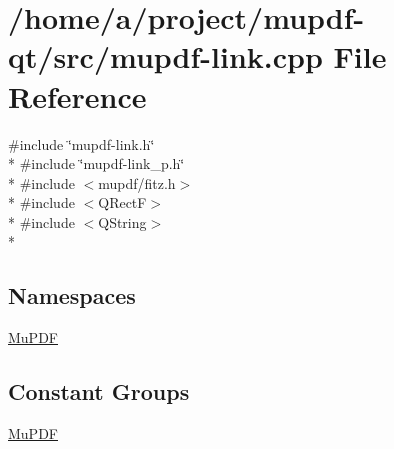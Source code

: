 \hypertarget{mupdf-link_8cpp}{\section{/home/a/project/mupdf-\/qt/src/mupdf-\/link.cpp File Reference}
\label{mupdf-link_8cpp}
}
{\ttfamily \#include \char`\"{}mupdf-\/link.\-h\char`\"{}}\\*
{\ttfamily \#include \char`\"{}mupdf-\/link\-\_\-p.\-h\char`\"{}}\\*
{\ttfamily \#include $<$mupdf/fitz.\-h$>$}\\*
{\ttfamily \#include $<$Q\-Rect\-F$>$}\\*
{\ttfamily \#include $<$Q\-String$>$}\\*
\subsection*{Namespaces}
\begin{DoxyCompactItemize}
\item 
\hyperlink{namespace_mu_p_d_f}{Mu\-P\-D\-F}
\end{DoxyCompactItemize}
\subsection*{Constant Groups}
\begin{DoxyCompactItemize}
\item 
\hyperlink{namespace_mu_p_d_f}{Mu\-P\-D\-F}
\end{DoxyCompactItemize}
